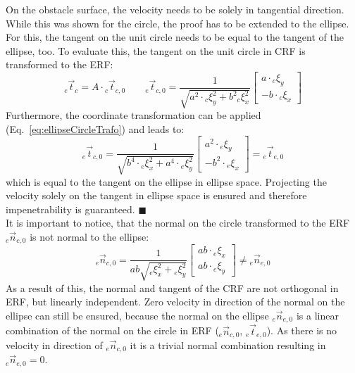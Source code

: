 On the obstacle surface, the velocity needs to be solely in tangential direction. While this was shown for the circle, the proof has to be extended to the ellipse. For this, the tangent on the unit circle needs to be equal to the tangent of the ellipse, too. To evaluate this, the tangent on the unit circle in CRF is transformed to the ERF:
\begin{equation}
  {}_e \vec{t}_{c} = A \cdot {}_c \vec{t}_{c,0}
   \qquad
   {}_e \vec{t}_{c,0} = \frac{1}{\sqrt{a^2 \cdot {}_c\xi_y^2 + b^2 {}_c\xi_x^2}}
  \begin{bmatrix}
       a \cdot {}_c\xi_y \\
     - b \cdot {}_c\xi_x
   \end{bmatrix}
\end{equation}
Furthermore, the coordinate transformation can be applied (Eq.~\ref{eq:ellipseCircleTrafo}) and leads to:
\begin{equation}
  {}_e \vec{t}_{c,0} =
  \frac{1}{\sqrt{b^4 \cdot {}_e\xi_x^2 + a^4 \cdot{}_e \xi_y^2}}
  \begin{bmatrix}
    a^2 \cdot {}_e\xi_y \\
    - b^2 \cdot {}_e\xi_x
  \end{bmatrix}
   =
    {}_e \vec{t}_{e,0}
\end{equation}
which is equal to the tangent on the ellipse in ellipse space. Projecting the velocity solely on the tangent in ellipse space is ensured and therefore impenetrability is guaranteed. \hfill $\blacksquare$ \\

It is important to notice, that the normal on the circle transformed to the ERF ${}_e \vec n_{c,0} $ is not normal to the ellipse:
\begin{equation}
  {}_e\vec n_{c,0}
  =
  \frac{1}{a b\sqrt{ {}_e\xi_x^2 + {}_e \xi_y^2}}
  \begin{bmatrix}
     ab \cdot{}_e\xi_x \\
     ab \cdot {}_e\xi_y
   \end{bmatrix}
  \neq
  {}_e\vec n_{e,0}
\end{equation}
As a result of this, the normal and tangent of the CRF are not orthogonal in ERF, but linearly independent. Zero velocity in direction of the normal on the ellipse can still be ensured, because the normal on the ellipse ${}_e \vec n_{e,0}$ is a linear combination of the normal on the circle in ERF (${}_e \vec n_{c,0}$, ${}_e \vec t_{e,0}$). As there is no velocity in direction of ${}_e \vec n_{c,0}$ it is a trivial normal combination resulting in ${}_e \vec n_{e,0} = 0$.

